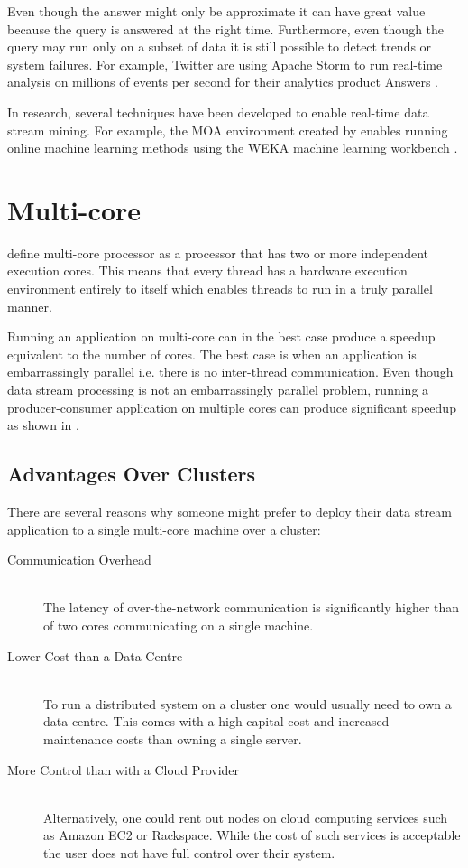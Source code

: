 \documentclass[bsc,logo,frontabs,twoside,singlespacing,normalheadings,parskip]{infthesis}\usepackage[]{graphicx}\usepackage[]{color}
\begin{document}
Even though the answer might only be approximate it can have great value because the query is answered at the right time. Furthermore, even though the query may run only on a subset of data it is still possible to detect trends or system failures. For example, Twitter are using Apache Storm to run real-time analysis on millions of events per second for their analytics product Answers \citep{Solovey}.

In research, several techniques have been developed to enable real-time data stream mining. For example, the MOA environment created by \citet{Bifet:2010:MMO:1756006.1859903} enables running online machine learning methods using the WEKA machine learning workbench \citep{Holmes1994}.

\section{Multi-core}
\label{sec:multicore}

\textcite{akhter2006multi} define multi-core processor as a processor that has two or more independent execution cores. This means that every thread has a hardware execution environment entirely to itself which enables threads to run in a truly parallel manner.

Running an application on multi-core can in the best case produce a speedup equivalent to the number of cores. The best case is when an application is embarrassingly parallel i.e. there is no inter-thread communication. Even though data stream processing is not an embarrassingly parallel problem, running a producer-consumer application on multiple cores can produce significant speedup as shown in  \citep{Prat-Perez:2013:PPM:2450027.2450037}.

\subsection{Advantages Over Clusters}
\label{subsec:advantages}

There are several reasons why someone might prefer to deploy their data stream application to a single multi-core machine over a cluster:

\begin{description}
	\item[Communication Overhead] \hfill \\
	The latency of over-the-network communication is significantly higher than of two cores communicating on a single machine.
	\item[Lower Cost than a Data Centre] \hfill \\
	To run a distributed system on a cluster one would usually need to own a data centre. This comes with a high capital cost and increased maintenance costs than owning a single server.
	\item[More Control than with a Cloud Provider] \hfill \\
	Alternatively, one could rent out nodes on cloud computing services such as Amazon EC2 or Rackspace. While the cost of such services is acceptable the user does not have full control over their system.
\end{description}
\end{document}
